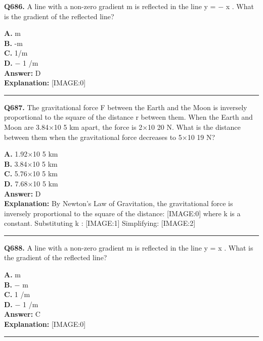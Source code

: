 \documentclass[12pt]{article}
\begin{document}
\noindent
\textbf{Q686.} A line with a non-zero gradient
m
is reflected in the line
y
=
−
x
. What is the gradient of the reflected line?



\textbf{A.} m \\
\textbf{B.} -m \\
\textbf{C.} 1/m \\
\textbf{D.} −
1
/m \\

\textbf{Answer:} D \\
\textbf{Explanation:} [IMAGE:0]

\hrule
\vspace{1em}


\noindent
\textbf{Q687.} The gravitational force F between the Earth and the Moon is inversely proportional to the square of the distance r between them. When the Earth and Moon are 3.84×10
5
km apart, the force is 2×10
20
N. What is the distance between them when the gravitational force decreases to 5×10
19
N?



\textbf{A.} 1.92×10
5
km \\
\textbf{B.} 3.84×10
5
km \\
\textbf{C.} 5.76×10
5
km \\
\textbf{D.} 7.68×10
5
km \\

\textbf{Answer:} D \\
\textbf{Explanation:} By Newton's Law of Gravitation, the gravitational force is inversely proportional to the square of the distance:
[IMAGE:0]
where k is a constant.
Substituting
k
:
[IMAGE:1]
Simplifying:
[IMAGE:2]

\hrule
\vspace{1em}


\noindent
\textbf{Q688.} A line with a non-zero gradient
m
is reflected in the line
y
=
x
. What is the gradient of the reflected line?



\textbf{A.} m \\
\textbf{B.} −
m \\
\textbf{C.} 1
/m
​ \\
\textbf{D.} −
1
/m
​ \\

\textbf{Answer:} C \\
\textbf{Explanation:} [IMAGE:0]

\hrule
\vspace{1em}
\end{document}
